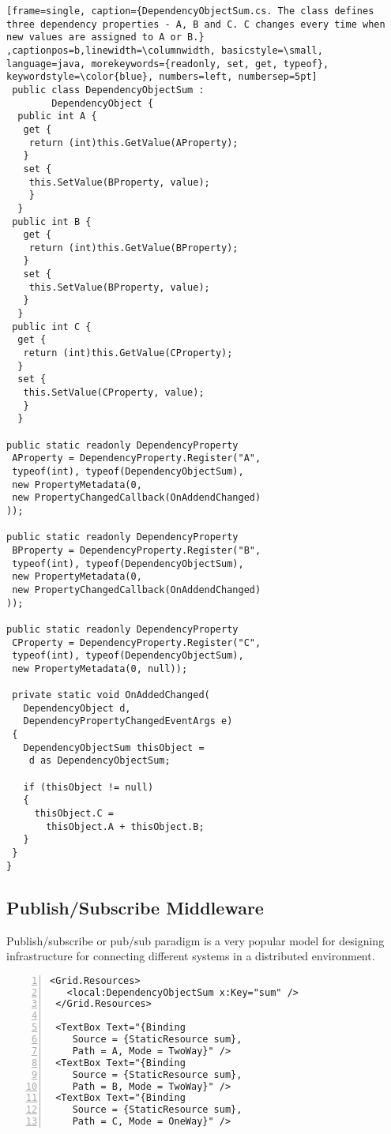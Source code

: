 \documentclass{sigplanconf}
\begin{document}
\begin{lstlisting}[frame=single, caption={DependencyObjectSum.cs. The class defines three dependency properties - A, B and C. C changes every time when new values are assigned to A or B.} ,captionpos=b,linewidth=\columnwidth, basicstyle=\small, language=java, morekeywords={readonly, set, get, typeof}, keywordstyle=\color{blue}, numbers=left, numbersep=5pt]
 public class DependencyObjectSum : 
		DependencyObject {
  public int A {
   get {
    return (int)this.GetValue(AProperty);
   }
   set {
    this.SetValue(BProperty, value);
    }
  }
 public int B {
   get {
    return (int)this.GetValue(BProperty);
   }
   set {
    this.SetValue(BProperty, value);
   }
  }
 public int C {
  get {
   return (int)this.GetValue(CProperty);
  }
  set {
   this.SetValue(CProperty, value);
   }
  }

public static readonly DependencyProperty
 AProperty = DependencyProperty.Register("A",
 typeof(int), typeof(DependencyObjectSum),
 new PropertyMetadata(0,
 new PropertyChangedCallback(OnAddendChanged)
));

public static readonly DependencyProperty
 BProperty = DependencyProperty.Register("B",
 typeof(int), typeof(DependencyObjectSum),
 new PropertyMetadata(0,
 new PropertyChangedCallback(OnAddendChanged)
));

public static readonly DependencyProperty
 CProperty = DependencyProperty.Register("C",
 typeof(int), typeof(DependencyObjectSum),
 new PropertyMetadata(0, null));

 private static void OnAddedChanged(
   DependencyObject d, 
   DependencyPropertyChangedEventArgs e)
 {
   DependencyObjectSum thisObject = 
    d as DependencyObjectSum;

   if (thisObject != null)
   {
     thisObject.C = 
       thisObject.A + thisObject.B;
   }
 }
}
\end{lstlisting}

\subsection{Publish/Subscribe Middleware}

Publish/subscribe or pub/sub paradigm is a very popular model for designing infrastructure for connecting different systems in a distributed environment.

\bigskip

\begin{lstlisting}[frame=single, caption={DependencyObjectSum.xaml. Here three different text boxes are defined for testing the code from the previous listing},captionpos=b,linewidth=\columnwidth, basicstyle=\small, morekeywords={Source, Path}, keywordstyle=\color{blue},
numbers=left, numbersep=5pt]
 <Grid.Resources>
   <local:DependencyObjectSum x:Key="sum" />
 </Grid.Resources>

 <TextBox Text="{Binding 
	Source = {StaticResource sum}, 
	Path = A, Mode = TwoWay}" />
 <TextBox Text="{Binding 
	Source = {StaticResource sum}, 
	Path = B, Mode = TwoWay}" />
 <TextBox Text="{Binding 
	Source = {StaticResource sum}, 
	Path = C, Mode = OneWay}" />

\end{lstlisting}
\end{document}
